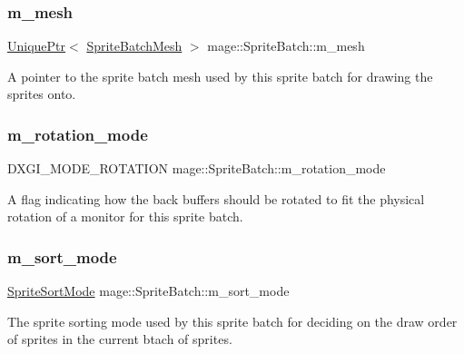 \subsubsection{\texorpdfstring{m\+\_\+mesh}{m\_mesh}}
{\footnotesize\ttfamily \hyperlink{namespacemage_a3316d7143a973e37adf1110f2e80ca31}{Unique\+Ptr}$<$ \hyperlink{classmage_1_1_sprite_batch_mesh}{Sprite\+Batch\+Mesh} $>$ mage\+::\+Sprite\+Batch\+::m\+\_\+mesh\hspace{0.3cm}{\ttfamily [private]}}

A pointer to the sprite batch mesh used by this sprite batch for drawing the sprites onto. \hypertarget{classmage_1_1_sprite_batch_ae062f178efe4a3af9c1573f8f8c4deee}{}\label{classmage_1_1_sprite_batch_ae062f178efe4a3af9c1573f8f8c4deee} 
\subsubsection{\texorpdfstring{m\+\_\+rotation\+\_\+mode}{m\_rotation\_mode}}
{\footnotesize\ttfamily D\+X\+G\+I\+\_\+\+M\+O\+D\+E\+\_\+\+R\+O\+T\+A\+T\+I\+ON mage\+::\+Sprite\+Batch\+::m\+\_\+rotation\+\_\+mode\hspace{0.3cm}{\ttfamily [private]}}

A flag indicating how the back buffers should be rotated to fit the physical rotation of a monitor for this sprite batch. \hypertarget{classmage_1_1_sprite_batch_a0b2b16b0d9eb63501b6fc0f9ce85e022}{}\label{classmage_1_1_sprite_batch_a0b2b16b0d9eb63501b6fc0f9ce85e022} 
\subsubsection{\texorpdfstring{m\+\_\+sort\+\_\+mode}{m\_sort\_mode}}
{\footnotesize\ttfamily \hyperlink{namespacemage_a256fa5833eecc408923de7ffadb5e014}{Sprite\+Sort\+Mode} mage\+::\+Sprite\+Batch\+::m\+\_\+sort\+\_\+mode\hspace{0.3cm}{\ttfamily [private]}}

The sprite sorting mode used by this sprite batch for deciding on the draw order of sprites in the current btach of sprites. \hypertarget{classmage_1_1_sprite_batch_a65ad09d31c928ab1522d8b2c0c509b9a}{}\label{classmage_1_1_sprite_batch_a65ad09d31c928ab1522d8b2c0c509b9a} 

